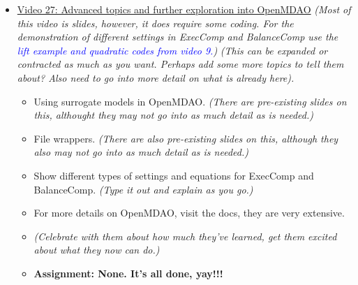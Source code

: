 \documentclass[12pt, letterpaper]{article}
\begin{document}
\begin{itemize}
	\item \underline{Video 27: Advanced topics and further exploration into OpenMDAO} \textit{(Most of this video is slides, however, it does require some coding. For the demonstration of different settings in ExecComp and BalanceComp use the \textcolor{blue}{lift example and quadratic codes from video 9.})} \textit{(This can be expanded or contracted as much as you want. Perhaps add some more topics to tell them about? Also need to go into more detail on what is already here).}
		\begin{itemize}
			\item Using surrogate models in OpenMDAO. \textit{(There are pre-existing slides on this, althought they may not go into as much detail as is needed.)}
			\item File wrappers. \textit{(There are also pre-existing slides on this, although they also may not go into as much detail as is needed.)}
			\item Show different types of settings and equations for ExecComp and BalanceComp. \textit{(Type it out and explain as you go.)} 
			\item For more details on OpenMDAO, visit the docs, they are very extensive.
			\item \textit{(Celebrate with them about how much they’ve learned, get them excited about what they now can do.)}
			\item \textbf{Assignment: None. It's all done, yay!!!}
		\end{itemize}
	
\end{itemize}
\end{document}
